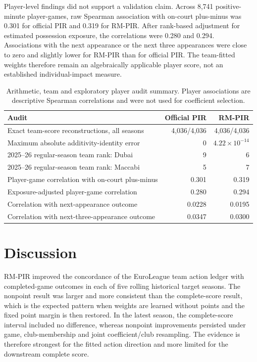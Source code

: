 \documentclass[pdflatex,sn-mathphys-num]{sn-jnl}
\begin{document}
Player-level findings did not support a validation claim. Across 8,741 positive-minute player-games, raw Spearman association with on-court plus-minus was 0.301 for official PIR and 0.319 for RM-PIR. After rank-based adjustment for estimated possession exposure, the correlations were 0.280 and 0.294. Associations with the next appearance or the next three appearances were close to zero and slightly lower for RM-PIR than for official PIR. The team-fitted weights therefore remain an algebraically applicable player score, not an established individual-impact measure.

\begin{table}[t]
\caption{Arithmetic, team and exploratory player audit summary. Player associations are descriptive Spearman correlations and were not used for coefficient selection.}
\label{tab:audits}
\centering
\small
\begin{tabular}{@{}p{}rr@{}}
\toprule
Audit & Official PIR & RM-PIR \\
\midrule
Exact team-score reconstructions, all seasons & 4,036/4,036 & 4,036/4,036 \\
Maximum absolute additivity-identity error & 0 & \(4.22\times10^{-14}\) \\
2025--26 regular-season team rank: Dubai & 9 & 6 \\
2025--26 regular-season team rank: Maccabi & 5 & 7 \\
Player-game correlation with on-court plus-minus & 0.301 & 0.319 \\
Exposure-adjusted player-game correlation & 0.280 & 0.294 \\
Correlation with next-appearance outcome & 0.0228 & 0.0195 \\
Correlation with next-three-appearance outcome & 0.0347 & 0.0300 \\
\bottomrule
\end{tabular}
\end{table}

\section{Discussion}

RM-PIR improved the concordance of the EuroLeague team action ledger with completed-game outcomes in each of five rolling historical target seasons. The nonpoint result was larger and more consistent than the complete-score result, which is the expected pattern when weights are learned without points and the fixed point margin is then restored. In the latest season, the complete-score interval included no difference, whereas nonpoint improvements persisted under game, club-membership and joint coefficient/club resampling. The evidence is therefore strongest for the fitted action direction and more limited for the downstream complete score.
\end{document}

